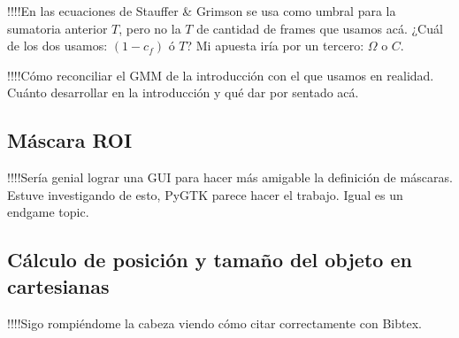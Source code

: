 \documentclass[12pt,a4paper]{article}
\begin{document}
!!!!En las ecuaciones de Stauffer & Grimson se usa como umbral para la sumatoria anterior $T$, pero no la $T$ de cantidad de frames que usamos acá.
¿Cuál de los dos usamos: $(1-c_f)$ ó $T$? Mi apuesta iría por un tercero: $\Omega$ o $C$.

!!!!Cómo reconciliar el GMM de la introducción con el que usamos en realidad. Cuánto desarrollar en la introducción y qué dar por sentado acá.

\subsection{Máscara ROI}

!!!!Sería genial lograr una GUI para hacer más amigable la definición de máscaras. Estuve investigando de esto, PyGTK parece hacer el trabajo. Igual es un endgame topic.

\subsection{Cálculo de posición y tamaño del objeto en cartesianas}


\pagebreak

!!!!Sigo rompiéndome la cabeza viendo cómo citar correctamente con Bibtex.

{}

\end{document}
